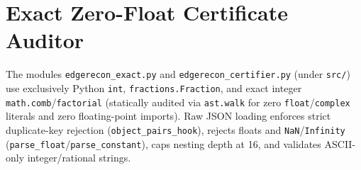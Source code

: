 \documentclass[10pt,twocolumn]{article}
\begin{document}
\section{Exact Zero-Float Certificate Auditor}\label{sec:certifier}
The modules \texttt{edgerecon\_\allowbreak exact.py} and \texttt{edgerecon\_\allowbreak certifier.py} (under \texttt{src/}) use exclusively Python \texttt{int}, \texttt{fractions.\allowbreak Fraction}, and exact integer \texttt{math.\allowbreak comb}/\texttt{factorial} (statically audited via \texttt{ast.walk} for zero \texttt{float}/\texttt{complex} literals and zero floating-point imports). Raw JSON loading enforces strict duplicate-key rejection (\texttt{object\_\allowbreak pairs\_\allowbreak hook}), rejects floats and \texttt{NaN}/\texttt{Infinity} (\texttt{parse\_\allowbreak float}/\texttt{parse\_\allowbreak constant}), caps nesting depth at 16, and validates ASCII-only integer/rational strings.
\end{document}
